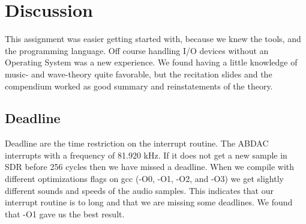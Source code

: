 \section{Discussion}
This assignment was easier getting started with, because we knew the tools,  and the programming language.
Off course handling I/O devices without an Operating System was a new experience. We found having a little
knowledge of music- and wave-theory quite favorable, but the recitation slides and the compendium worked as
good summary and reinstatements of the theory.

\subsection{Deadline}
Deadline are the time restriction on the interrupt routine. The ABDAC interrupts with a frequency of 81.920 kHz.
If it does not get a new sample in SDR before 256 cycles then we have missed a deadline. When we compile with
different optimizations flags on gcc (-O0, -O1, -O2, and -O3) we get slightly different sounds and speeds of the
audio samples. This indicates that our interrupt routine is to long and that we are missing some deadlines.
We found that -O1 gave us the best result.
